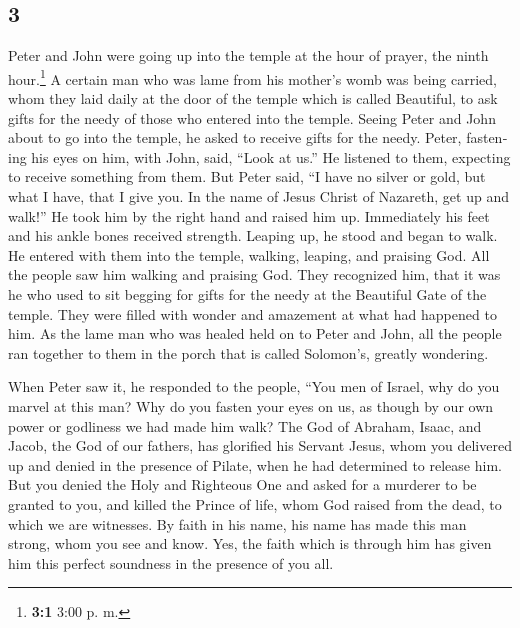 \begin{paracol}{2}
\switchcolumn
\begin{otherlanguage}{english}

\hypertarget{section-5}{%
\section{3}\label{section-5}}

 Peter and John were going up into the temple at the hour
of prayer, the ninth hour.\footnote{\textbf{3:1} 3:00 p. m.}
 A certain man who was lame from his mother's womb was
being carried, whom they laid daily at the door of the temple which is
called Beautiful, to ask gifts for the needy of those who entered into
the temple.  Seeing Peter and John about to go into the
temple, he asked to receive gifts for the needy.  Peter,
fastening his eyes on him, with John, said, ``Look at us.''
 He listened to them, expecting to receive something from
them.  But Peter said, ``I have no silver or gold, but
what I have, that I give you. In the name of Jesus Christ of Nazareth,
get up and walk!''  He took him by the right hand and
raised him up. Immediately his feet and his ankle bones received
strength.  Leaping up, he stood and began to walk. He
entered with them into the temple, walking, leaping, and praising God.
 All the people saw him walking and praising God.
 They recognized him, that it was he who used to sit
begging for gifts for the needy at the Beautiful Gate of the temple.
They were filled with wonder and amazement at what had happened to him.
 As the lame man who was healed held on to Peter and
John, all the people ran together to them in the porch that is called
Solomon's, greatly wondering.

 When Peter saw it, he responded to the people, ``You men
of Israel, why do you marvel at this man? Why do you fasten your eyes on
us, as though by our own power or godliness we had made him walk?
 The God of Abraham, Isaac, and Jacob, the God of our
fathers, has glorified his Servant Jesus, whom you delivered up and
denied in the presence of Pilate, when he had determined to release him.
 But you denied the Holy and Righteous One and asked for
a murderer to be granted to you,  and killed the Prince
of life, whom God raised from the dead, to which we are witnesses.
 By faith in his name, his name has made this man strong,
whom you see and know. Yes, the faith which is through him has given him
this perfect soundness in the presence of you all.


\end{otherlanguage}
\end{paracol}
